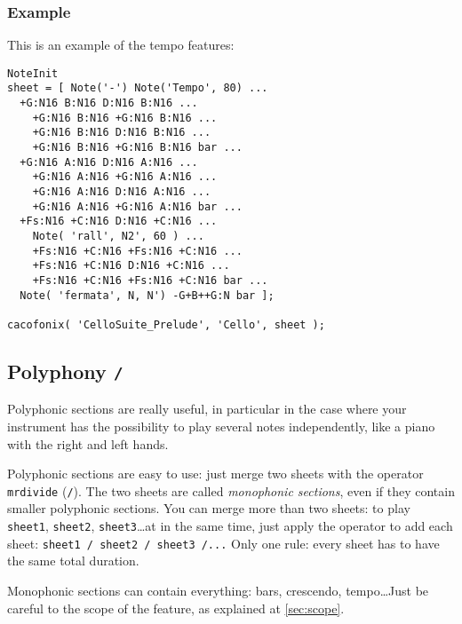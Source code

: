 \documentclass{article}
\begin{document}
\subsubsection{Example}

This is an example of the tempo features: \\

\begin{lstlisting}
NoteInit
sheet = [ Note('-') Note('Tempo', 80) ...
  +G:N16 B:N16 D:N16 B:N16 ...
    +G:N16 B:N16 +G:N16 B:N16 ...
    +G:N16 B:N16 D:N16 B:N16 ...
    +G:N16 B:N16 +G:N16 B:N16 bar ...
  +G:N16 A:N16 D:N16 A:N16 ...
    +G:N16 A:N16 +G:N16 A:N16 ...
    +G:N16 A:N16 D:N16 A:N16 ...
    +G:N16 A:N16 +G:N16 A:N16 bar ...
  +Fs:N16 +C:N16 D:N16 +C:N16 ...
    Note( 'rall', N2', 60 ) ...
    +Fs:N16 +C:N16 +Fs:N16 +C:N16 ...
    +Fs:N16 +C:N16 D:N16 +C:N16 ...
    +Fs:N16 +C:N16 +Fs:N16 +C:N16 bar ...
  Note( 'fermata', N, N') -G+B++G:N bar ];

cacofonix( 'CelloSuite_Prelude', 'Cello', sheet );
\end{lstlisting}

\subsection{Polyphony \lstinline!/!}
\label{sec:Polyphony}

Polyphonic sections are really useful, in particular in the case where your instrument has the possibility to play several notes independently, like a piano with the right and left hands.

Polyphonic sections are easy to use: just merge two sheets with the operator \lstinline!mrdivide! (\lstinline!/!). The two sheets are called \emph{monophonic sections}, even if they contain smaller polyphonic sections. You can merge more than two sheets: to play \lstinline!sheet1!, \lstinline!sheet2!, \lstinline!sheet3!\dots at in the same time, just apply the operator to add each sheet: \lstinline!sheet1 / sheet2 / sheet3 /...! Only one rule: every sheet has to have the same total duration.

Monophonic sections can contain everything: bars, crescendo, tempo\dots Just be careful to the scope of the feature, as explained at \ref{sec:scope}.
\end{document}
